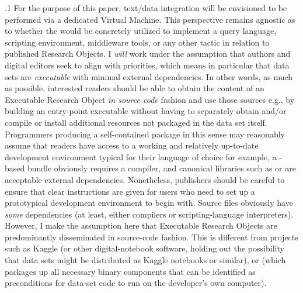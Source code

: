 \documentclass[11pt, twocolumn]{article}
\begin{document}
\p.1{%
For the purpose of this paper, text/data integration will
be envisioned to be performed via a dedicated Virtual Machine.
This perspective remains agnostic as to whether the
 would be concretely utilized to implement a query language,
scripting environment, middleware tools, or any other
tactic in relation to published Research Objects. I \textit{will}
work under the assumption that authors and digital editors
seek to align with  priorities, which means in particular
that data sets are \textit{executable} with minimal external dependencies.
In other words, as much as possible, interested readers
should be able to obtain the content of an Executable Research
Object \textit{in source code} fashion and use those sources
\mdash{} e.g., by building an entry-point executable \mdash{} without having to
separately obtain and/or compile or install additional resources
not packaged in the data set itself. Programmers producing a
self-contained package in this sense may reasonably assume that
readers have access to a working and relatively up-to-date development
environment typical for their language of choice \mdash{} for example,
a -based bundle obviously requires a  compiler, and
canonical libraries such as  or  are acceptable external
dependencies. Nonetheless, publishers should be careful to
ensure that clear instructions are given for users who need to
set up a prototypical development environment to begin with. Source files obviously
have \textit{some} dependencies (at least, either compilers or scripting-language
interpreters). However, I make the assumption here that Executable
Research Objects are predominantly disseminated in source-code fashion.
This is different from projects such as Kaggle (or other digital-notebook
software, holding out the possibility that data sets might be
distributed as Kaggle notebooks or similar), or   (which packages
up all necessary binary components that can be identified as preconditions
for data-set code to run on the developer's own computer).
}%
\end{document}
